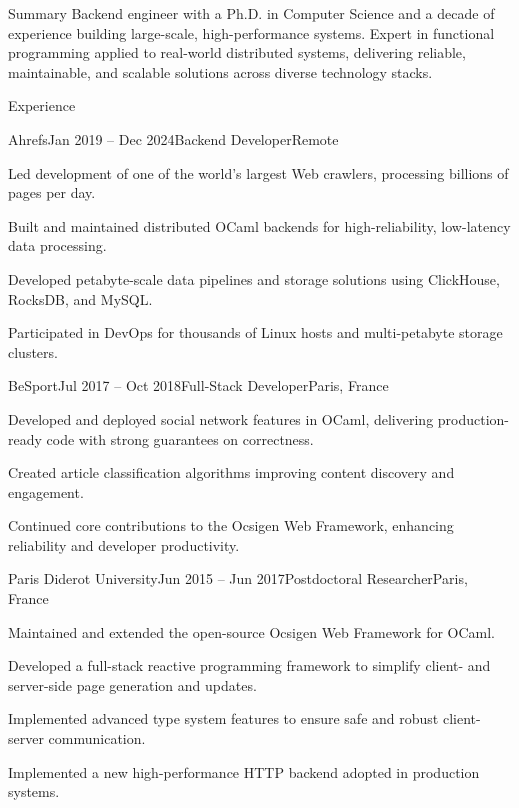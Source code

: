 \documentclass[11pt]{resume}
\begin{document}
\begin{rSection}{Summary}
Backend engineer with a Ph.D. in Computer Science and a decade of
experience building large-scale, high-performance systems. Expert in
functional programming applied to real-world distributed systems,
delivering reliable, maintainable, and scalable solutions across
diverse technology stacks.
\end{rSection}

\begin{rSection}{Experience}

  \begin{rSubsection}{Ahrefs}{Jan 2019 -- Dec 2024}{Backend
      Developer}{Remote}
  \item Led development of one of the world’s largest Web crawlers,
    processing billions of pages per day.
  \item Built and maintained distributed OCaml backends for
    high-reliability, low-latency data processing.
  \item Developed petabyte-scale data pipelines and storage solutions
    using ClickHouse, RocksDB, and MySQL.
  \item Participated in DevOps for thousands of Linux hosts and
    multi-petabyte storage clusters.
  \end{rSubsection}

  \begin{rSubsection}{BeSport}{Jul 2017 -- Oct 2018}{Full-Stack
      Developer}{Paris, France}
  \item Developed and deployed social network features in OCaml,
    delivering production-ready code with strong guarantees on
    correctness.
  \item Created article classification algorithms improving content
    discovery and engagement.
  \item Continued core contributions to the Ocsigen Web Framework,
    enhancing reliability and developer productivity.
  \end{rSubsection}

  \begin{rSubsection}{Paris Diderot University}{Jun 2015 -- Jun
      2017}{Postdoctoral Researcher}{Paris, France}
  \item Maintained and extended the open-source Ocsigen Web Framework
    for OCaml.
  \item Developed a full-stack reactive programming framework to
    simplify client- and server-side page generation and updates.
  \item Implemented advanced type system features to ensure safe and
    robust client-server communication.
  \item Implemented a new high-performance HTTP backend adopted in
    production systems.
  \end{rSubsection}

\end{rSection}
\end{document}
